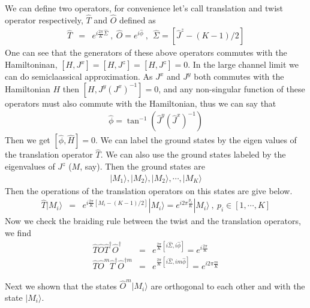 \documentclass[reprint,prb,superscriptaddress]{revtex4-1}
\begin{document}
\par We can define two operators, for convenience let's call translation and twist operator respectively, $\hat{T}$ and $\hat{O}$ defined as 
\begin{eqnarray}
\hat{T} &=& e^{i\frac{2\pi}{K} \hat{\Sigma}} ~,~\hat{O} = e^{i\hat{\phi}}~,~~\hat{\Sigma}=[\hat{J}^z-(K-1)/2]
\end{eqnarray}
One can see that the generators of these above operators commutes with the Hamiltoninan, $[H,J^x]=[H,J^z]=[H,J^z]=0$. In the large channel limit we can do semiclaassical approximation. As $J^x$ and $J^y$ both commutes with the Hamiltonian $H$ then $[H,J^y{(J^{x})}^{-1}]=0$, and any non-singular function of these operators must also commute with the Hamiltonian, thus we can say that
\begin{eqnarray}
\hat{\phi}=\tan^{-1}(\hat{J}^y(\hat{J}^x)^{-1})
\end{eqnarray}
Then we get $[\hat{\phi},\hat{H}]=0$. We can label the ground states by the eigen values of the translation operator $\hat{T}$. We can also use the ground states labeled by the eigenvalues of $J^z$ ($M$, say). Then the ground states are 
\begin{eqnarray}
|M_1\rangle,|M_2\rangle,|M_2\rangle,\cdots ,|M_K\rangle
\end{eqnarray}
Then the operations of the translation operators on this states are give below.
\begin{eqnarray}
\hat{T}|M_i\rangle &=& e^{i\frac{2\pi}{K} [M_i-(K-1)/2]} |M_i\rangle = e^{i2\pi\frac{p_i}{K} } |M_i\rangle~,~p_i\in[1,\cdots,K]
\end{eqnarray}
Now we check the braiding rule between the twist and the translation operators, we find
\begin{eqnarray}
\hat{T}\hat{O}\hat{T}^{\dagger}\hat{O}^{\dagger} &=& e^{\frac{2\pi }{K}[i\hat{\Sigma},i\hat{\phi}]}=e^{i\frac{2\pi }{K}} \nonumber\\
\hat{T}\hat{O}^m\hat{T}^{\dagger}\hat{O}^{\dagger m} &=& e^{\frac{2\pi }{K}[i\hat{\Sigma},im\hat{\phi}]}=e^{i2\pi \frac{m}{K}}
\end{eqnarray}

Next we shown that the states $\hat{O}^m |M_i\rangle$ are orthogonal to each other and with the state $|M_i\rangle$.
\end{document}
